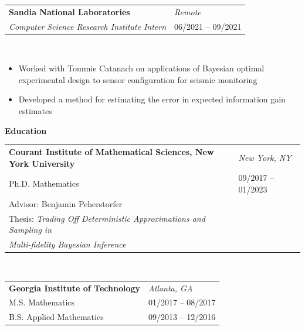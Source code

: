 \documentclass{article}
\begin{document}
\begin{tabular}{p{4.8in}p{2in}}
    \bf{Sandia National Laboratories} & \emph{Remote}\\
    \emph{Computer Science Research Institute Intern} & 06/2021 -- 09/2021 \\
\end{tabular}
\vspace{-0.2in}
\begin{minipage}{0.03\textwidth}
~\\
\end{minipage}
\begin{minipage}{0.7\textwidth}
\begin{itemize}[label=\raisebox{0.25ex}{\tiny$\bullet$}]
    \item Worked with Tommie Catanach on applications of Bayesian optimal experimental design to sensor configuration for seismic monitoring
    \item Developed a method for estimating the error in expected information gain estimates
\end{itemize}
\end{minipage}


\vspace{0.4in}

{\Large\bf Education} \hrulefill \\

\begin{tabular}{p{4.8in}p{2in}}
    \bf{Courant Institute of Mathematical Sciences, New York University}  & \emph{New York, NY} \\
    Ph.D. Mathematics & 09/2017 -- 01/2023 \\
    Advisor: Benjamin Peherstorfer & \\
    Thesis: \emph{Trading Off Deterministic Approximations and Sampling in}\\ \hspace{0.45in} \emph{Multi-fidelity Bayesian Inference} & 
\end{tabular}
~\\

\begin{tabular}{p{4.8in}p{2in}}
    \bf{Georgia Institute of Technology} & \emph{Atlanta, GA}\\
    M.S. Mathematics & 01/2017 -- 08/2017 \\
    B.S. Applied Mathematics & 09/2013 -- 12/2016 \\
\end{tabular}

\vspace{0.25in}
\newpage
\end{document}

